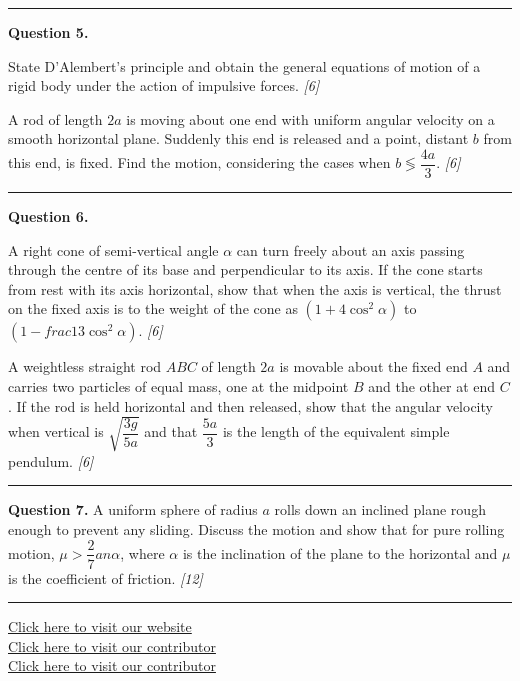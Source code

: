 \documentclass[11pt,a4paper]{article}
\newcommand{\pts}[1]{\hfill   \textit{[#1]}}
\begin{document}
\medskip\rule{\linewidth}{0.2pt}

\medskip


\noindent   \textbf{Question 5.}

\begin{parts}
  \item State D'Alembert's principle and obtain the general equations of motion of a rigid body under the action of impulsive forces. \pts{6}
  \item A rod of length $2a$ is moving about one end with uniform angular velocity on a smooth horizontal plane. Suddenly this end is released and a point, distant $b$ from this end, is fixed. Find the motion, considering the cases when $b \lessgtr \dfrac{4a}{3}$. \pts{6}
\end{parts}

\medskip\rule{\linewidth}{0.2pt}

\medskip


\noindent   \textbf{Question 6.}

\begin{parts}
  \item A right cone of semi-vertical angle $\alpha$ can turn freely about an axis passing through the centre of its base and perpendicular to its axis. If the cone starts from rest with its axis horizontal, show that when the axis is vertical, the thrust on the fixed axis is to the weight of the cone as $(1 + 4\cos^2\alpha)$ to $(1 -  frac{1}{3}\cos^2\alpha)$. \pts{6}
  \item A weightless straight rod $ABC$ of length $2a$ is movable about the fixed end $A$ and carries two particles of equal mass, one at the midpoint $B$ and the other at end $C$. If the rod is held horizontal and then released, show that the angular velocity when vertical is $\sqrt{\dfrac{3g}{5a}}$ and that $\dfrac{5a}{3}$ is the length of the equivalent simple pendulum. \pts{6}
\end{parts}

\medskip\rule{\linewidth}{0.2pt}

\medskip


\noindent   \textbf{Question 7.}
A uniform sphere of radius $a$ rolls down an inclined plane rough enough to prevent any sliding. Discuss the motion and show that for pure rolling motion, $\mu > \dfrac{2}{7} an\alpha$, where $\alpha$ is the inclination of the plane to the horizontal and $\mu$ is the coefficient of friction. \pts{12}

\vfill\rule{\linewidth}{0.4pt}

\begin{center}\small
  \href{https://bhu-exam.vercel.app/}{Click here to visit our website}\\[4pt]
  \href{https://me-aryan.vercel.app/}{Click here to visit our contributor}\\[4pt]
  \href{https://quashan-me.vercel.app/}{Click here to visit our contributor}
\end{center}
\end{document}
